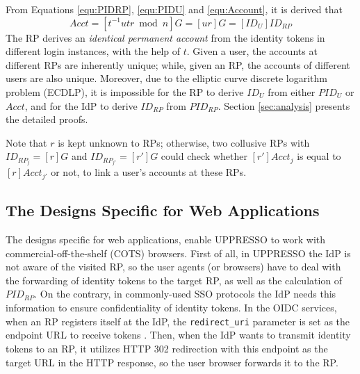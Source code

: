 From Equations \ref{equ:PIDRP}, \ref{equ:PIDU} and \ref{equ:Account}, it is derived that
\begin{equation*}
   Acct =  [t^{-1}utr \bmod n]G = [ur]G = [ID_U]ID_{RP}
   \label{equ:AccountNotChanged}
\end{equation*}
The RP derives an \emph{identical permanent account} from the identity tokens in different login instances,
    with the help of $t$. %
Given a user, the accounts at different RPs are inherently unique;
while, given an RP, the accounts of different users are also unique.
Moreover,
    due to the elliptic curve discrete logarithm problem (ECDLP),
it is impossible for the RP to derive $ID_U$ from either $PID_U$ or $Acct$,
    and for the IdP to derive $ID_{RP}$ from $PID_{RP}$.
Section \ref{sec:analysis} presents the detailed proofs.

Note that $r$ is kept unknown to RPs; otherwise, two collusive RPs with $ID_{RP_j} = [r]G$ and $ID_{RP_{j'}} = [r']G$ could check whether $[r']Acct_j$ is equal to $[r]Acct_{j'}$ or not,
    to link a user's accounts at these RPs.

\subsection{The Designs Specific for Web Applications}
\label{sec:web-design}
The designs specific for web applications,
enable UPPRESSO to work with commercial-off-the-shelf (COTS) browsers.
%
First of all, in UPPRESSO the IdP is not aware of the visited RP,
 so the user agents (or browsers) have to deal with the forwarding of identity tokens
    to the target RP, as well as the calculation of $PID_{RP}$.
On the contrary,
    in commonly-used SSO protocols the IdP needs this information to ensure confidentiality of identity tokens.
In the OIDC services, when an RP registers itself at the IdP, the \verb+redirect_uri+ parameter
    is set as the endpoint URL to receive tokens  \cite{OpenIDConnect}.
Then, %
 when the IdP wants to transmit identity tokens to an RP,
    it utilizes HTTP 302 redirection with this endpoint as the target URL in the HTTP response,
     so the user browser forwards it to the RP.

